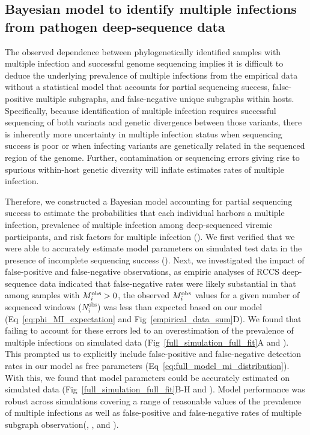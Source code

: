\documentclass[10pt,letterpaper]{article}
\newcommand{\MI}{M^{\text{\text{obs}}}}
\begin{document}
\subsection{Bayesian model to identify multiple infections from pathogen deep-sequence data}
The observed dependence between phylogenetically identified samples with multiple infection and successful genome sequencing implies it is difficult to deduce the underlying prevalence of multiple infections from the empirical data without a statistical model that accounts for partial sequencing success, false-positive multiple subgraphs, and false-negative unique subgraphs within hosts. Specifically, because identification of multiple infection requires successful sequencing of both variants and genetic divergence between those variants, there is inherently more uncertainty in multiple infection status when sequencing success is poor or when infecting variants are genetically related in the sequenced region of the genome. Further, contamination or sequencing errors giving rise to spurious within-host genetic diversity will inflate estimates rates of multiple infection. \par

Therefore, we constructed a Bayesian model accounting for partial sequencing success to estimate the probabilities that each individual harbors a multiple infection, prevalence of multiple infection among deep-sequenced viremic participants, and  risk factors for multiple infection (). We first verified that we were able to accurately estimate model parameters on simulated test data  in the presence of incomplete sequencing success (). Next, we investigated the impact of false-positive and false-negative observations, as empiric analyses of RCCS deep-sequence data indicated that false-negative rates were likely substantial in that among samples with $\MI_i > 0$, the observed $\MI_i$ values for a given number of sequenced windows ($N^{\text{obs}}_i$) was less than expected based on our model (Eq~\ref{eq:phi_MI_expectation} and  Fig~\ref{empirical_data_sum}D). We found that failing to account for these errors led to an overestimation of the prevalence of multiple infections on simulated data (Fig~\ref{full_simulation_full_fit}A and ). This prompted us to explicitly include false-positive and false-negative detection rates in our model as free parameters (Eq~\ref{eq:full_model_mi_distribution}). With this, we found that model parameters could be accurately estimated on simulated data (Fig~\ref{full_simulation_full_fit}B-H and ). Model performance was robust across simulations covering a range of reasonable values of the prevalence of multiple infections as well as false-positive and false-negative rates of multiple subgraph observation(, , and ). \par 
\end{document}
